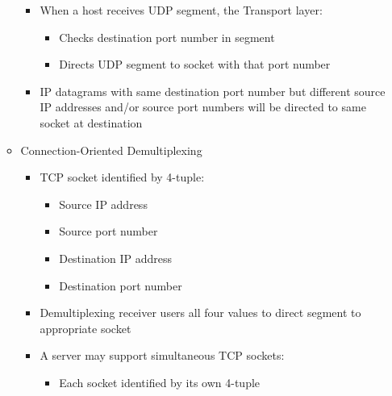 \begin{itemize}
\begin{itemize}
\begin{itemize}
          \item When a host receives UDP segment, the Transport layer:

            \begin{itemize}

              \item Checks destination port number in segment

              \item Directs UDP segment to socket with that port number

            \end{itemize}

          \item IP datagrams with same destination port number but different source IP addresses and/or source port numbers will be directed to same socket at destination

        \end{itemize}

      \item Connection-Oriented Demultiplexing

        \begin{itemize}

          \item TCP socket identified by 4-tuple:

            \begin{itemize}

              \item Source IP address

              \item Source port number

              \item Destination IP address

              \item Destination port number

            \end{itemize}

          \item Demultiplexing receiver users all four values to direct segment to appropriate socket

          \item A server may support simultaneous TCP sockets:

            \begin{itemize}

              \item Each socket identified by its own 4-tuple


\end{itemize}
\end{itemize}
\end{itemize}
\end{itemize}

